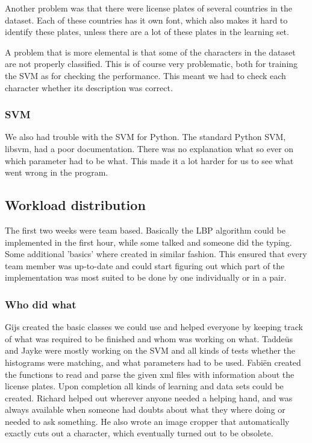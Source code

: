 \documentclass[a4paper]{article}
\begin{document}
Another problem was that there were license plates of several countries in
the dataset. Each of these countries has it own font, which also makes it
hard to identify these plates, unless there are a lot of these plates in the
learning set.

A problem that is more elemental is that some of the characters in the dataset
are not properly classified. This is of course very problematic, both for
training the SVM as for checking the performance. This meant we had to check
each character whether its description was correct.

\subsubsection*{SVM}

We also had trouble with the SVM for Python. The standard Python SVM, libsvm,
had a poor documentation. There was no explanation what so ever on which
parameter had to be what. This made it a lot harder for us to see what went
wrong in the program.

\subsection{Workload distribution}

The first two weeks were team based. Basically the LBP algorithm could be
implemented in the first hour, while some talked and someone did the typing.
Some additional 'basics' where created in similar fashion. This ensured that
every team member was up-to-date and could start figuring out which part of the
implementation was most suited to be done by one individually or in a pair.

\subsubsection*{Who did what}

Gijs created the basic classes we could use and helped everyone by keeping
track of what was required to be finished and whom was working on what.
Tadde\"us and Jayke were mostly working on the SVM and all kinds of tests
whether the histograms were matching, and what parameters had to be used.
Fabi\"en created the functions to read and parse the given xml files with
information about the license plates. Upon completion all kinds of learning
and data sets could be created. Richard helped out wherever anyone needed a
helping hand, and was always available when someone had doubts about what they
where doing or needed to ask something. He also wrote an image cropper that
automatically exactly cuts out a character, which eventually turned out to be
obsolete.
\end{document}
